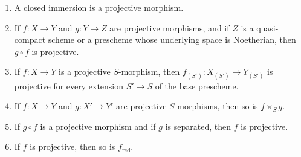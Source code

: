 \begin{proposition}[5.5.5]
\label{II.5.5.5}
\begin{enumerate}
  \item[\rm{(i)}] A closed immersion is a projective morphism.
  \item[\rm{(ii)}] If $f:X\to Y$ and $g:Y\to Z$ are projective
  morphisms, and if $Z$ is a quasi-compact scheme or a prescheme whose
  underlying space is Noetherian, then $g\circ f$ is projective.
  \item[\rm{(iii)}] If $f:X\to Y$ is a projective $S$-morphism, then
  $f_{(S')}:X_{(S')}\to Y_{(S')}$ is projective for every extension
  $S'\to S$ of the base prescheme.
  \item[\rm{(iv)}] If $f:X\to Y$ and $g:X'\to Y'$ are projective
  $S$-morphisms, then so is $f\times_Sg$.
  \item[\rm{(v)}] If $g\circ f$ is a projective morphism and if $g$ is
  separated, then $f$ is projective.
  \item[\rm{(vi)}] If $f$ is projective, then so is
  $f_{\mathrm{red}}$.
\end{enumerate}
\end{proposition}

